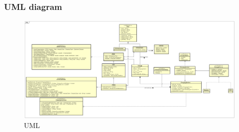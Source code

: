\clearpage
\subsubsection{UML diagram}
\begin{figure}[h!]
    \begin{center}
        \includegraphics[keepaspectratio, width=16cm]{UML.png}
        \caption{UML}
    \end{center}
\end{figure}
